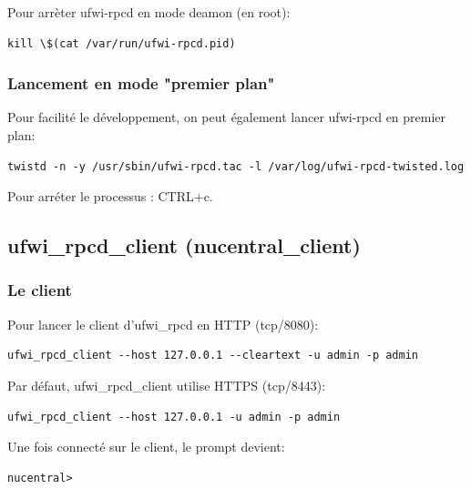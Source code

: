 \documentclass[12pt]{report}
\begin{document}
\begin{itemize}
Pour arrèter ufwi-rpcd en mode deamon (en root):
\begin{verbatim}kill \$(cat /var/run/ufwi-rpcd.pid)\end{verbatim}
   
\subsubsection{Lancement en mode "premier plan"}
Pour facilité le développement, on peut également lancer ufwi-rpcd en premier plan:
\begin{verbatim}twistd -n -y /usr/sbin/ufwi-rpcd.tac -l /var/log/ufwi-rpcd-twisted.log\end{verbatim}
Pour arréter le processus : CTRL+c.

\subsection{ufwi\_rpcd\_client (nucentral\_client)}
\subsubsection{Le client}
Pour lancer le client d'ufwi\_rpcd en HTTP (tcp/8080):
\begin{verbatim}ufwi_rpcd_client --host 127.0.0.1 --cleartext -u admin -p admin\end{verbatim}
Par défaut, ufwi\_rpcd\_client utilise HTTPS (tcp/8443):
\begin{verbatim}ufwi_rpcd_client --host 127.0.0.1 -u admin -p admin\end{verbatim}
Une fois connecté sur le client, le prompt devient: 
\begin{verbatim}nucentral>\end{verbatim}


\end{itemize}
\end{document}
